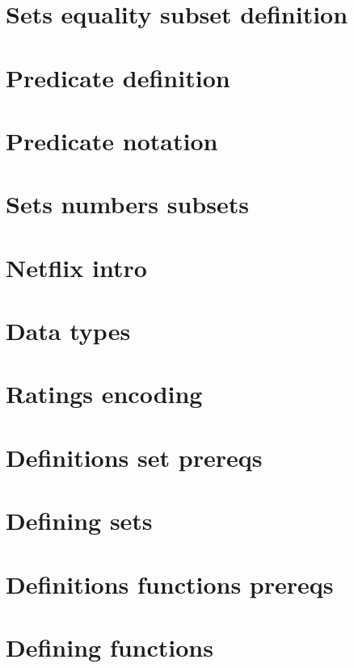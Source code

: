 
\section*{Sets equality subset definition}

\vfill
\section*{Predicate definition}

\vfill
\section*{Predicate notation}

\vfill
\section*{Sets numbers subsets}

\vfill
\section*{Netflix intro}

\vfill
\section*{Data types}

\vfill
\section*{Ratings encoding}

\vfill
\section*{Definitions set prereqs}

\vfill
\section*{Defining sets}

\vfill
\section*{Definitions functions prereqs}

\vfill
\section*{Defining functions}

\vfill
